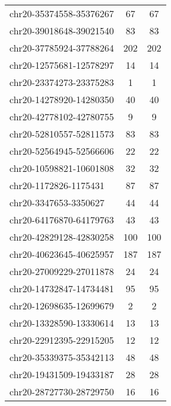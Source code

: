 \begin{longtable}{lSS}
	chr20-35374558-35376267 & 67     & 67                                  \\
	chr20-39018648-39021540 & 83     & 83                                  \\
	chr20-37785924-37788264 & 202    & 202                                 \\
	chr20-12575681-12578297 & 14     & 14                                  \\
	chr20-23374273-23375283 & 1      & 1                                   \\
	chr20-14278920-14280350 & 40     & 40                                  \\
	chr20-42778102-42780755 & 9      & 9                                   \\
	chr20-52810557-52811573 & 83     & 83                                  \\
	chr20-52564945-52566606 & 22     & 22                                  \\
	chr20-10598821-10601808 & 32     & 32                                  \\
	chr20-1172826-1175431   & 87     & 87                                  \\
	chr20-3347653-3350627   & 44     & 44                                  \\
	chr20-64176870-64179763 & 43     & 43                                  \\
	chr20-42829128-42830258 & 100    & 100                                 \\
	chr20-40623645-40625957 & 187    & 187                                 \\
	chr20-27009229-27011878 & 24     & 24                                  \\
	chr20-14732847-14734481 & 95     & 95                                  \\
	chr20-12698635-12699679 & 2      & 2                                   \\
	chr20-13328590-13330614 & 13     & 13                                  \\
	chr20-22912395-22915205 & 12     & 12                                  \\
	chr20-35339375-35342113 & 48     & 48                                  \\
	chr20-19431509-19433187 & 28     & 28                                  \\
	chr20-28727730-28729750 & 16     & 16                                  \\

\end{longtable}
